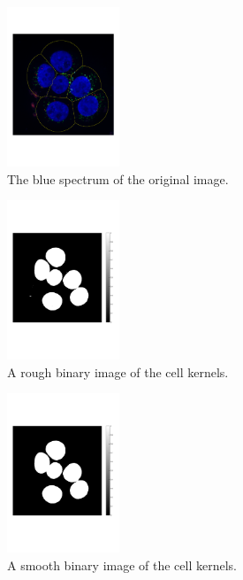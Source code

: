 \documentclass[10pt,twocolumn]{article}
\begin{document}
\begin{figure}[ht]
\centering
\includegraphics[width=0.3\textwidth]{Bilder/CellLinesNCircles.pdf}
\caption{The blue spectrum of the original image.}
\label{fig:ImColourBlue}
\end{figure}

\begin{figure}[ht]
\centering
\includegraphics[width=0.3\textwidth]{Bilder/ThershholdedKernels.pdf}
\caption{A rough binary image of the cell kernels.}
\label{fig:CellKernelsThreshRough}
\end{figure}

\begin{figure}[ht]
\centering
\includegraphics[width=0.3\textwidth]{Bilder/BWCleanKernels.pdf}
\caption{A smooth binary image of the cell kernels.}
\label{fig:CellKernelsThresSmooth}
\end{figure}
\end{document}
